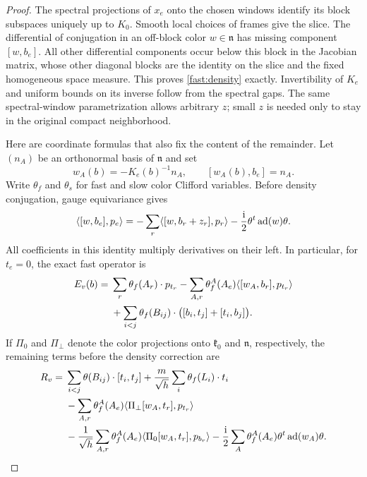 \begin{proof}
The spectral projections of $x_e$ onto the chosen windows identify its
block subspaces uniquely up to $K_0$. Smooth local choices of frames
give the slice. The differential of conjugation in an off-block color
$w\in\mathfrak n$ has missing component $[w,b_e]$. All other differential
components occur below this block in the Jacobian matrix, whose other
diagonal blocks are the identity on the slice and the fixed homogeneous
space measure. This proves \eqref{fast:density} exactly. Invertibility
of $K_e$ and uniform bounds on its inverse follow from the spectral
gaps. The same spectral-window parametrization allows arbitrary $z$;
small $z$ is needed only to stay in the original compact neighborhood.

Here are coordinate formulas that also fix the content of the
remainder. Let $(n_A)$ be an orthonormal basis of $\mathfrak n$ and set
\[
 w_A(b)=-K_e(b)^{-1}n_A,
 \qquad [w_A(b),b_e]=n_A.
\]
Write $\theta_f$ and $\theta_s$ for fast and slow color Clifford
variables. Before density conjugation, gauge equivariance gives
\begin{equation}
 \langle[w,b_e],p_e\rangle
 =-\sum_r\langle[w,b_r+z_r],p_r\rangle
   -\frac{\mathrm i}{2}\theta^t\operatorname{ad}(w)\theta.
 \label{fast:gauge-momentum}
\end{equation}
All coefficients in this identity multiply derivatives on their left.
In particular, for $t_e=0$, the exact fast operator is
\begin{align}
 E_v(b)={}&\sum_r\theta_f(A_r)\cdot p_{t_r}
 -\sum_{A,r}\theta_f^A(A_e)
       \langle[w_A,b_r],p_{t_r}\rangle\notag\\
 &+\sum_{i<j}\theta_f(B_{ij})\cdot
                 \bigl([b_i,t_j]+[t_i,b_j]\bigr).
 \label{fast:E-coordinate}
\end{align}
If $\Pi_0$ and $\Pi_\perp$ denote the color projections onto
$\mathfrak k_0$ and $\mathfrak n$, respectively, the remaining terms
before the density correction are
\begin{align}
 R_v={}&\sum_{i<j}\theta(B_{ij})\cdot[t_i,t_j]
 +\frac m{\sqrt h}\sum_i\theta_f(L_i)\cdot t_i\notag\\
 &-\sum_{A,r}\theta_f^A(A_e)
       \langle\Pi_\perp[w_A,t_r],p_{t_r}\rangle\notag\\
 &-\frac1{\sqrt h}\sum_{A,r}\theta_f^A(A_e)
       \langle\Pi_0[w_A,t_r],p_{b_r}\rangle
 -\frac{\mathrm i}{2}\sum_A\theta_f^A(A_e)
                          \theta^t\operatorname{ad}(w_A)\theta.
 \label{fast:R-coordinate}
\end{align}

\end{proof}
